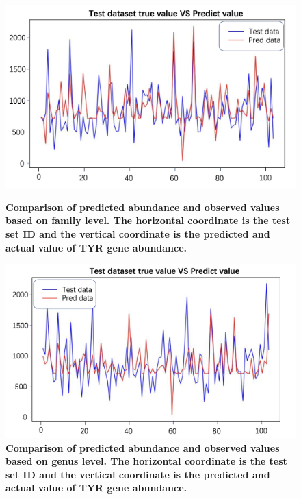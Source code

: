 \documentclass[12pt]{article}
\begin{document}
\begin{figure}[H]
    \centering
    \begin{minipage}{1\linewidth}
        \centering
        \includegraphics[width=\linewidth]{pic/family/pvst.png} 
         \caption{\small\bfseries Comparison of predicted abundance and observed values based on family level. The horizontal coordinate is the test set ID and the vertical coordinate is the predicted and actual value of TYR gene abundance.}
    \end{minipage}

    \vspace{0.1cm} %
    \begin{minipage}{1\linewidth}
        \centering
        \includegraphics[width=\linewidth]{pic/genus/pvst.png} 
         \caption{\small\bfseries Comparison of predicted abundance and observed values based on genus level. The horizontal coordinate is the test set ID and the vertical coordinate is the predicted and actual value of TYR gene abundance.}
    \end{minipage}
    \label{fig:combined}
\end{figure}
\end{document}
